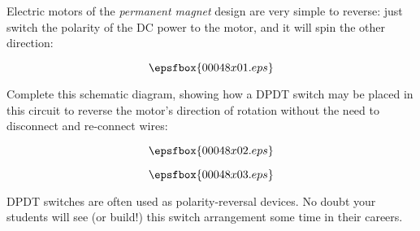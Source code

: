 

Electric motors of the {\it permanent magnet} design are very simple to reverse: just switch the polarity of the DC power to the motor, and it will spin the other direction:

$$\epsfbox{00048x01.eps}$$

Complete this schematic diagram, showing how a DPDT switch may be placed in this circuit to reverse the motor's direction of rotation without the need to disconnect and re-connect wires:

$$\epsfbox{00048x02.eps}$$







$$\epsfbox{00048x03.eps}$$







DPDT switches are often used as polarity-reversal devices.  No doubt your students will see (or build!) this switch arrangement some time in their careers.




